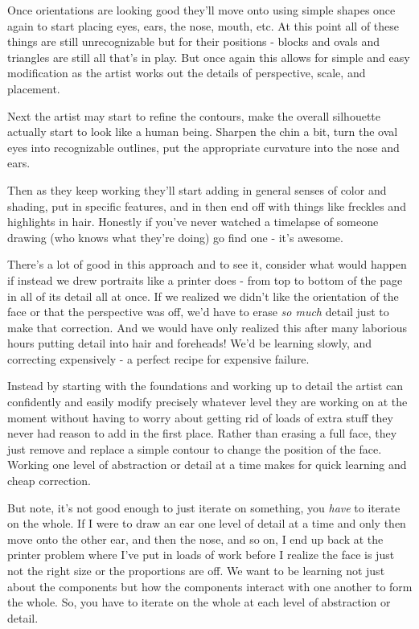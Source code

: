 \documentclass[11pt,a5paper]{book}
\begin{document}
Once orientations are looking good they'll move onto using simple shapes once again to start placing eyes, ears, the nose, mouth, etc. At this point all of these things are still unrecognizable but for their positions - blocks and ovals and triangles are still all that's in play. But once again this allows for simple and easy modification as the artist works out the details of perspective, scale, and placement.
\newline

Next the artist may start to refine the contours, make the overall silhouette actually start to look like a human being. Sharpen the chin a bit, turn the oval eyes into recognizable outlines, put the appropriate curvature into the nose and ears. 
\newline

Then as they keep working they'll start adding in general senses of color and shading, put in specific features, and in then end off with things like freckles and highlights in hair. Honestly if you've never watched a timelapse of someone drawing (who knows what they're doing) go find one - it's awesome.
\newline

There's a lot of good in this approach and to see it, consider what would happen if instead we drew portraits like a printer does - from top to bottom of the page in all of its detail all at once. If we realized we didn't like the orientation of the face or that the perspective was off, we'd have to erase \textit{so much} detail just to make that correction. And we would have only realized this after many laborious hours putting detail into hair and foreheads! We'd be learning slowly, and correcting expensively - a perfect recipe for expensive failure. 
\newline

Instead by starting with the foundations and working up to detail the artist can confidently and easily modify precisely whatever level they are working on at the moment without having to worry about getting rid of loads of extra stuff they never had reason to add in the first place. Rather than erasing a full face, they just remove and replace a simple contour to change the position of the face. Working one level of abstraction or detail at a time makes for quick learning and cheap correction.
\newline

But note, it's not good enough to just iterate on something, you \textit{have} to iterate on the whole. If I were to draw an ear one level of detail at a time and only then move onto the other ear, and then the nose, and so on, I end up back at the printer problem where I've put in loads of work before I realize the face is just not the right size or the proportions are off. We want to be learning not just about the components but how the components interact with one another to form the whole. So, you have to iterate on the whole at each level of abstraction or detail.
\newline
\end{document}
